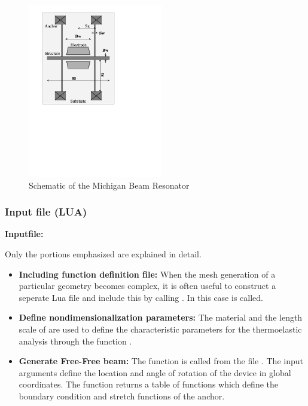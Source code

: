 \begin{figure}[htbp]
\centering
\includegraphics[trim = 0in 4in 1in 0in, clip, height = 3in]{fig/mich_la_frfr_beam2d_small.pdf}
\caption{Schematic of the Michigan Beam Resonator}
\label{fig:MichiganBeamResonator}
\end{figure}

\clearpage
\subsubsection*{Input file (LUA)}
\begin{flushleft}
  \textbf{Inputfile:}
  \\
\end{flushleft}
\hspace{1in}
{\footnotesize
{}
}

\clearpage
Only the portions emphasized are explained in detail.

\begin{itemize}

  \item{\textbf{Including function definition file:}}
  When the mesh generation of a particular geometry becomes
  complex, it is often useful to construct a seperate Lua
  file and include this by calling . In this
  case  is called.

  \item{\textbf{Define nondimensionalization parameters:}}
  The material  and the length scale of 
   are used to define the characteristic parameters
  for the thermoelastic analysis through the function 
  .

  \item{\textbf{Generate Free-Free beam:}}
  The function  is called from
  the file . The input
  arguments define the location and angle of rotation of the
  device in global coordinates. The function returns a table 
  of functions which define the boundary condition and stretch
  functions of the anchor.  

\end{itemize}

